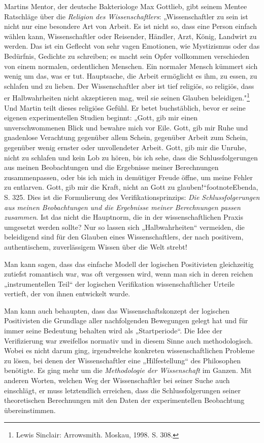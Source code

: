 \documentclass[11pt,a4paper]{article}
\begin{document}
Martins Mentor, der deutsche Bakteriologe Max Gottlieb, gibt seinem Mentee
Ratschläge über die \emph{Religion des Wissenschaftlers}: „Wissenschaftler zu
sein ist nicht nur eine besondere Art von Arbeit.  Es ist nicht so, dass eine
Person einfach wählen kann, Wissenschaftler oder Reisender, Händler, Arzt,
König, Landwirt zu werden. Das ist ein Geflecht von sehr vagen Emotionen, wie
Mystizismus oder das Bedürfnis, Gedichte zu schreiben; es macht sein Opfer
vollkommen verschieden von einem normalen, ordentlichen Menschen. Ein normaler
Mensch kümmert sich wenig um das, was er tut. Hauptsache, die Arbeit
ermöglicht es ihm, zu essen, zu schlafen und zu lieben. Der Wissenschaftler
aber ist tief religiös, so religiös, dass er Halbwahrheiten nicht akzeptieren
mag, weil sie seinen Glauben beleidigen."\footnote{Lewis Sinclair:
  Arrowsmith. Moskau, 1998. S. 308.} Und Martin teilt dieses religiöse Gefühl.
Er betet buchstäblich, bevor er seine eigenen experimentellen Studien beginnt:
„Gott, gib mir einen unverschwommenen Blick und bewahre mich vor Eile. Gott,
gib mir Ruhe und gnadenlose Verachtung gegenüber allem Schein, gegenüber
Arbeit zum Schein, gegenüber wenig ernster oder unvollendeter Arbeit. Gott,
gib mir die Unruhe, nicht zu schlafen und kein Lob zu hören, bis ich sehe,
dass die Schlussfolgerungen aus meinen Beobachtungen und die Ergebnisse meiner
Berechnungen zusammenpassen, oder bis ich mich in demütiger Freude öffne, um
meine Fehler zu entlarven. Gott, gib mir die Kraft, nicht an Gott zu
glauben!“footnote{Ebenda, S. 325.} Dies ist die Formulierung des
Verifikationsprinzips: \emph{Die Schlussfolgerungen aus meinen Beobachtungen
  und die Ergebnisse meiner Berechnungen passen zusammen}. Ist das nicht die
Hauptnorm, die in der wissenschaftlichen Praxis umgesetzt werden sollte?  Nur
so lassen sich „Halbwahrheiten“ vermeiden, die beleidigend sind für den
Glauben eines Wissenschaftlers, der nach positivem, authentischem,
zuverlässigem Wissen über die Welt strebt!

Man kann sagen, dass das einfache Modell der logischen Positivisten
gleichzeitig zutiefst romantisch war, was oft vergessen wird, wenn man sich in
deren reichen „instrumentellen Teil“ der logischen Verifikation
wissenschaftlicher Urteile vertieft, der von ihnen entwickelt wurde.

Man kann auch behaupten, dass das Wissenschaftskonzept der logischen
Positivisten die Grundlage aller nachfolgenden Bewegungen gelegt hat und für
immer seine Bedeutung behalten wird als „Startperiode“. Die Idee der
Verifizierung war zweifellos normativ und in diesem Sinne auch methodologisch.
Wobei es nicht darum ging, irgendwelche konkreten wissenschaftlichen Probleme
zu lösen, bei denen der Wissenschaftler eine „Hilfestellung“ des Philosophen
benötigte. Es ging mehr um die \emph{Methodologie der Wissenschaft} im Ganzen.
Mit anderen Worten, welchen Weg der Wissenschaftler bei seiner Suche auch
einschlägt, er muss letztendlich erreichen, dass die Schlussfolgerungen seiner
theoretischen Berechnungen mit den Daten der experimentellen Beobachtung
übereinstimmen.
\end{document}
